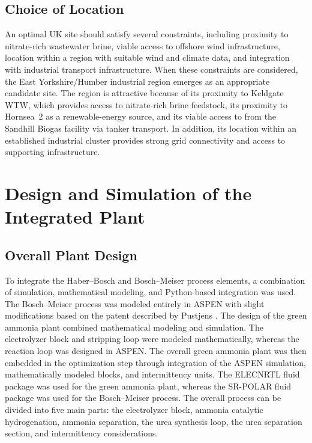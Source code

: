 \documentclass[letterpaper]{article}
\begin{document}
\subsection{Choice of Location}
An optimal UK site should satisfy several constraints, including
proximity to nitrate-rich wastewater brine, viable access to offshore
wind infrastructure, location within a region with suitable wind and
climate data, and integration with industrial  transport
infrastructure. When these constraints are considered, the East
Yorkshire/Humber industrial region emerges as an appropriate
candidate site. The region is attractive because of its proximity to
Keldgate WTW, which provides access to nitrate-rich brine feedstock,
its proximity to Hornsea~2 as a renewable-energy source, and its
viable access to  from the Sandhill Biogas facility via
tanker transport. In addition, its location within an established
industrial cluster provides strong grid connectivity and access to
supporting infrastructure.

\section{Design and Simulation of the Integrated Plant}

\subsection{Overall Plant Design}
To integrate the Haber--Bosch and Bosch--Meiser process elements, a
combination of simulation, mathematical modeling, and Python-based
integration was used. The Bosch--Meiser process was modeled entirely
in ASPEN with slight modifications based on the patent described by
Pustjens \cite{Pustjens2018}. The design of the green ammonia plant
combined mathematical modeling and simulation. The electrolyzer block
and stripping loop were modeled mathematically, whereas the reaction
loop was designed in ASPEN. The overall green ammonia plant was then
embedded in the optimization step through integration of the ASPEN
simulation, mathematically modeled blocks, and intermittency
units. The ELECNRTL fluid package was used for the green ammonia
plant, whereas the SR-POLAR fluid package was used for the
Bosch--Meiser process. The overall process can be divided into five
main parts: the electrolyzer block, ammonia catalytic hydrogenation,
ammonia separation, the urea synthesis loop, the urea separation
section, and intermittency considerations.
\end{document}
